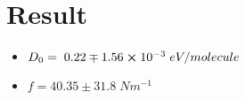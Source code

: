 \section{Result}
    \begin{itemize}
    \item $D_0=\;0.22\mp1.56\cross10^{-3}\;eV/molecule$
    \item $f=40.35\pm31.8\;N m^{-1}$
    \end{itemize}